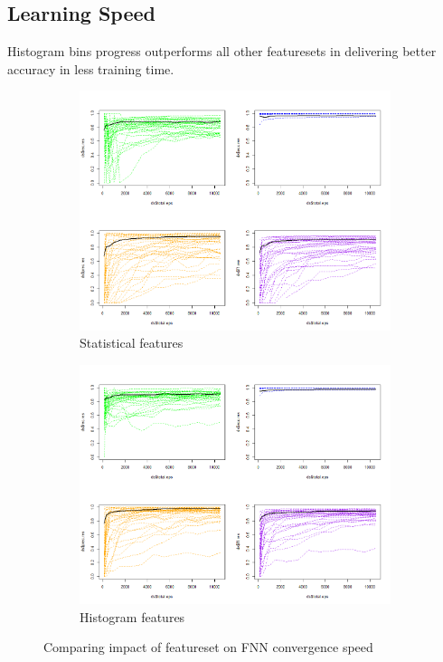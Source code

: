 \documentclass[journal,article,submit,moreauthors,pdftex]{Definitions/mdpi}
\begin{document}
\subsection{Learning Speed }
Histogram bins progress outperforms all other featuresets in delivering better accuracy in less training time.
\begin{figure}[H]
	\centering
	\begin{subfigure}{.5\textwidth}
		\centering
		\includegraphics[width=1\linewidth]{Definitions/images/fnn_statistical_set.png}
		\caption{Statistical features}
		\label{fig:fnn_balanced}
	\end{subfigure}%
	\begin{subfigure}{.5\textwidth}
		\centering
		\includegraphics[width=1\linewidth]{Definitions/images/fnn_hbin_set.png}
		\caption{Histogram features}
		\label{fig:fnn_imbalanced}
	\end{subfigure}%
	\caption{Comparing impact of featureset on FNN convergence speed}
	\label{fig:imbalance_dataset}
\end{figure} 
\end{document}
